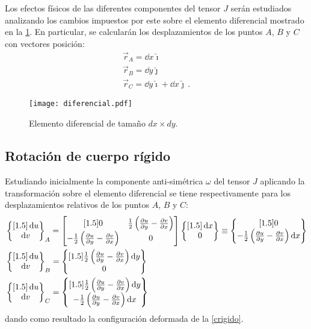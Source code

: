 \documentclass[../notas medios.tex]{subfiles}
\begin{document}
Los efectos físicos de las diferentes componentes del tensor $J$ serán estudiados analizando los cambios impuestos por este sobre el elemento diferencial mostrado en la \cref{diferencial}. En particular, se calcularán los desplazamientos de los puntos $A$, $B$ y $C$ con vectores posición:
\begin{align*}
\vec{r}_A = \dd{x}\hat \imath\\
\vec{r}_B = \dd{y}\hat \jmath\\
\vec{r}_C = \dd{y}\hat \imath + \dd{x}\hat \jmath\, .
\end{align*}

\begin{figure}[H]
\centering
	\texttt{[image: diferencial.pdf]}
	\caption{Elemento diferencial de tamaño $dx \times dy$.}
	\label{diferencial}
\end{figure}

\subsection{Rotación de cuerpo rígido}
Estudiando inicialmente la componente anti-simétrica $\omega$ del tensor $J$ aplicando la transformación sobre el elemento diferencial se tiene respectivamente para los desplazamientos relativos de los puntos $A$, $B$ y $C$:
\begin{align*}
&\begin{Bmatrix}[1.5]
\dd{u}\\
\dd{v}
\end{Bmatrix}_A = \begin{bmatrix}[1.5]
0 &\frac{1}{2}\left(\pdv{u}{y} - \pdv{v}{x}\right)\\
-\frac{1}{2}\left(\pdv{u}{y} - \pdv{v}{x}\right) &0
\end{bmatrix} \begin{Bmatrix}[1.5]
\dd{x}\\
0
\end{Bmatrix} \equiv \begin{Bmatrix}[1.5]
0\\
-\frac{1}{2}\left(\pdv{u}{y} - \pdv{v}{x}\right)\dd{x}
\end{Bmatrix}\\
&\begin{Bmatrix}[1.5]
\dd{u}\\
\dd{v}
\end{Bmatrix}_B = \begin{Bmatrix}[1.5]
\frac{1}{2}\left(\pdv{u}{y} - \pdv{v}{x}\right)\dd{y}\\
0
\end{Bmatrix}\\
&\begin{Bmatrix}[1.5]
\dd{u}\\
\dd{v}
\end{Bmatrix}_C = \begin{Bmatrix}[1.5]
\frac{1}{2}\left(\pdv{u}{y} - \pdv{v}{x}\right)\dd{y}\\
-\frac{1}{2}\left(\pdv{u}{y} - \pdv{v}{x}\right)\dd{x}\\
\end{Bmatrix}
\end{align*}
dando como resultado la configuración deformada de la \cref{crigido}.
\end{document}
